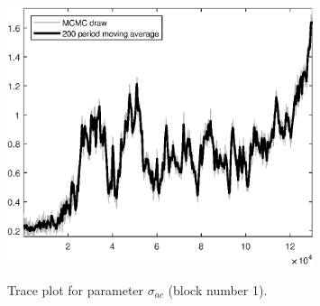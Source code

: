 \begin{figure}[H]
\centering
  \includegraphics[width=0.8\textwidth]{BRS_sectoral_wo_fixed_cost/graphs/TracePlot_sigma_ac_blck_1}\\
    \caption{Trace plot for parameter ${\sigma_{ac}}$ (block number 1).}
\end{figure}
